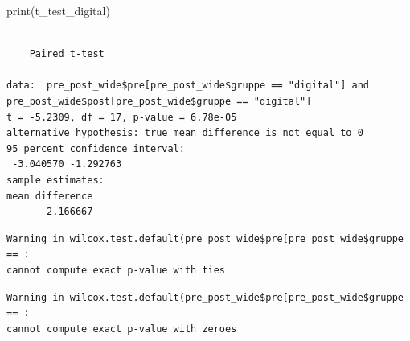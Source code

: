 \documentclass[
  letterpaper,
  DIV=11,
  numbers=noendperiod]{scrreprt}
\newenvironment{Shaded}{\begin{snugshade}}{\end{snugshade}}
\newcommand{\AttributeTok}[1]{\textcolor[rgb]{0.40,0.45,0.13}{#1}}
\newcommand{\ConstantTok}[1]{\textcolor[rgb]{0.56,0.35,0.01}{#1}}
\newcommand{\FunctionTok}[1]{\textcolor[rgb]{0.28,0.35,0.67}{#1}}
\newcommand{\NormalTok}[1]{\textcolor[rgb]{0.00,0.23,0.31}{#1}}
\newcommand{\OtherTok}[1]{\textcolor[rgb]{0.00,0.23,0.31}{#1}}
\newcommand{\SpecialCharTok}[1]{\textcolor[rgb]{0.37,0.37,0.37}{#1}}
\newcommand{\StringTok}[1]{\textcolor[rgb]{0.13,0.47,0.30}{#1}}
\begin{document}
\begin{Shaded}
\begin{Highlighting}[]
\FunctionTok{print}\NormalTok{(t\_test\_digital)}
\end{Highlighting}
\end{Shaded}

\begin{verbatim}

    Paired t-test

data:  pre_post_wide$pre[pre_post_wide$gruppe == "digital"] and pre_post_wide$post[pre_post_wide$gruppe == "digital"]
t = -5.2309, df = 17, p-value = 6.78e-05
alternative hypothesis: true mean difference is not equal to 0
95 percent confidence interval:
 -3.040570 -1.292763
sample estimates:
mean difference 
      -2.166667 
\end{verbatim}

\begin{Shaded}
\end{Shaded}

\begin{verbatim}
Warning in wilcox.test.default(pre_post_wide$pre[pre_post_wide$gruppe == :
cannot compute exact p-value with ties
\end{verbatim}

\begin{verbatim}
Warning in wilcox.test.default(pre_post_wide$pre[pre_post_wide$gruppe == :
cannot compute exact p-value with zeroes
\end{verbatim}

\begin{Shaded}
\end{Shaded}
\end{document}
